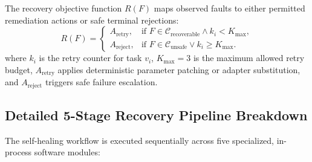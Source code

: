 \documentclass[conference]{IEEEtran}
\begin{document}
The recovery objective function $R(F)$ maps observed faults to either permitted remediation actions or safe terminal rejections:
\begin{equation}
R(F) = \begin{cases}
A_{\text{retry}}, & \text{if } F \in \mathcal{C}_{\text{recoverable}} \land k_i < K_{\text{max}}, \\
A_{\text{reject}}, & \text{if } F \in \mathcal{C}_{\text{unsafe}} \lor k_i \ge K_{\text{max}}.
\end{cases}
\end{equation}
where $k_i$ is the retry counter for task $v_i$, $K_{\text{max}}=3$ is the maximum allowed retry budget, $A_{\text{retry}}$ applies deterministic parameter patching or adapter substitution, and $A_{\text{reject}}$ triggers safe failure escalation.

\subsection{Detailed 5-Stage Recovery Pipeline Breakdown}
The self-healing workflow is executed sequentially across five specialized, in-process software modules:
\end{document}
